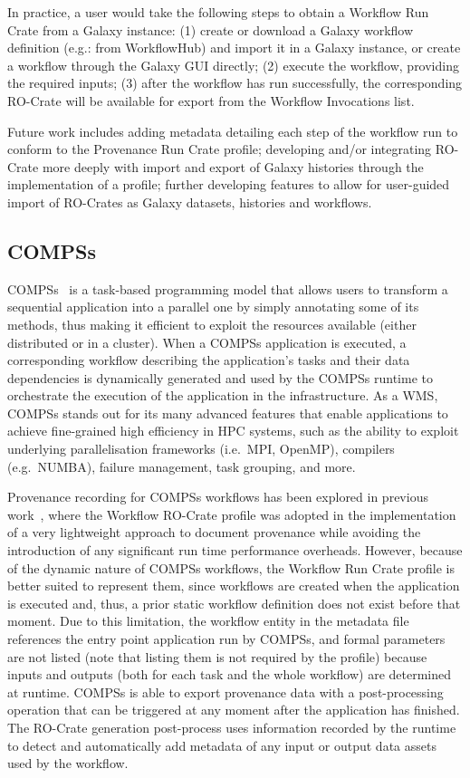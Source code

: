 \documentclass[10pt,letterpaper]{article}
\begin{document}
In practice, a user would take the following steps to obtain a Workflow Run Crate from a Galaxy instance: (1) create or download a Galaxy workflow definition (e.g.: from WorkflowHub) and import it in a Galaxy instance, or create a workflow through the Galaxy GUI directly; (2) execute the workflow, providing the required inputs; (3) after the workflow has run successfully, the corresponding RO-Crate will be available for export from the Workflow Invocations list.

Future work includes adding metadata detailing each step of the workflow run to conform to the Provenance Run Crate profile; developing and/or integrating RO-Crate more deeply with import and export of Galaxy histories through the implementation of a profile; further developing features to allow for user-guided import of RO-Crates as Galaxy datasets, histories and workflows.

\subsection{COMPSs}\label{compss}

COMPSs~\cite{Lordan 2014} is a task-based programming model that allows users to transform a sequential application into a parallel one by simply annotating some of its methods, thus making it efficient to exploit the resources available (either distributed or in a cluster).
When a COMPSs application is executed, a corresponding workflow describing the application's tasks and their data dependencies is dynamically generated and used by the COMPSs runtime to orchestrate the execution of the application in the infrastructure.
As a WMS, COMPSs stands out for its many advanced features that enable applications to achieve fine-grained high efficiency in HPC systems, such as the ability to exploit underlying parallelisation frameworks (i.e.~MPI, OpenMP), compilers (e.g.~NUMBA), failure management, task grouping, and more.

Provenance recording for COMPSs workflows has been explored in previous work~\cite{Sirvent 2022}, where the Workflow RO-Crate profile was adopted in the implementation of a very lightweight approach to document provenance while avoiding the introduction of any significant run time performance overheads.
However, because of the dynamic nature of COMPSs workflows, the Workflow Run Crate profile is better suited to represent them, since workflows are created when the application is executed and, thus, a prior static workflow definition does not exist before that moment.
Due to this limitation, the workflow entity in the metadata file references the entry point application run by COMPSs, and formal parameters are not listed (note that listing them is not required by the profile) because inputs and outputs (both for each task and the whole workflow) are determined at runtime.
COMPSs is able to export provenance data with a post-processing operation that can be triggered at any moment after the application has finished.
The RO-Crate generation post-process uses information recorded by the runtime to detect and automatically add metadata of any input or output data assets used by the workflow.
\end{document}
